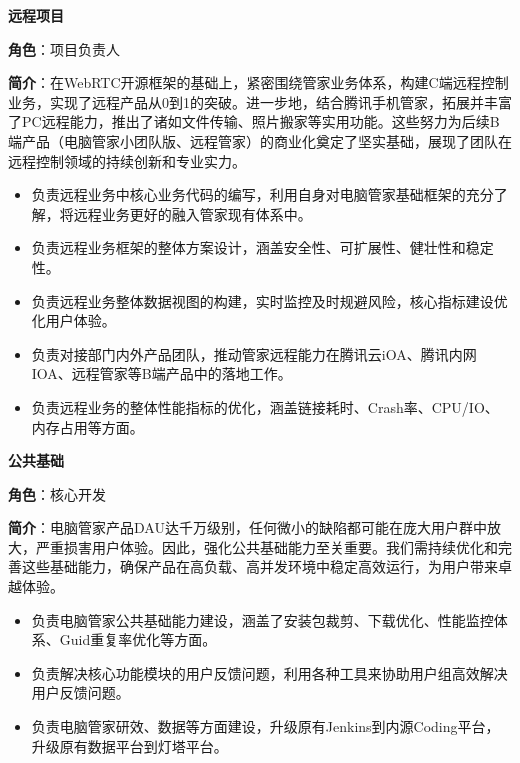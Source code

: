 \documentclass{resume}
\begin{document}
{\textbf{\large{远程项目}}}
\vspace{0.2ex}
\par{\textbf{角色}：项目负责人}
\vspace{0.3ex}
\par{\textbf{简介}：在WebRTC开源框架的基础上，紧密围绕管家业务体系，构建C端远程控制业务，实现了远程产品从0到1的突破。进一步地，结合腾讯手机管家，拓展并丰富了PC远程能力，推出了诸如文件传输、照片搬家等实用功能。这些努力为后续B端产品（电脑管家小团队版、远程管家）的商业化奠定了坚实基础，展现了团队在远程控制领域的持续创新和专业实力。}
\begin{itemize}[itemsep=0.1em]
  \item 负责远程业务中核心业务代码的编写，利用自身对电脑管家基础框架的充分了解，将远程业务更好的融入管家现有体系中。
  \item 负责远程业务框架的整体方案设计，涵盖安全性、可扩展性、健壮性和稳定性。
  \item 负责远程业务整体数据视图的构建，实时监控及时规避风险，核心指标建设优化用户体验。
  \item 负责对接部门内外产品团队，推动管家远程能力在腾讯云iOA、腾讯内网IOA、远程管家等B端产品中的落地工作。
  \item 负责远程业务的整体性能指标的优化，涵盖链接耗时、Crash率、CPU/IO、内存占用等方面。
\end{itemize}

\vspace{0.5ex}
{\textbf{\large{公共基础}}}
\vspace{0.2ex}
\par{\textbf{角色}：核心开发}
\vspace{0.3ex}
\par{\textbf{简介}：电脑管家产品DAU达千万级别，任何微小的缺陷都可能在庞大用户群中放大，严重损害用户体验。因此，强化公共基础能力至关重要。我们需持续优化和完善这些基础能力，确保产品在高负载、高并发环境中稳定高效运行，为用户带来卓越体验。}
\begin{itemize}[itemsep=0.1em]
  \item 负责电脑管家公共基础能力建设，涵盖了安装包裁剪、下载优化、性能监控体系、Guid重复率优化等方面。
  \item 负责解决核心功能模块的用户反馈问题，利用各种工具来协助用户组高效解决用户反馈问题。
  \item 负责电脑管家研效、数据等方面建设，升级原有Jenkins到内源Coding平台，升级原有数据平台到灯塔平台。
\end{itemize}
\end{document}
